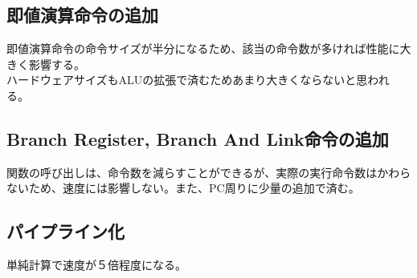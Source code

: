\documentclass{jsreport}
\begin{document}
	\subsection{即値演算命令の追加}
		即値演算命令の命令サイズが半分になるため、該当の命令数が多ければ性能に大きく影響する。\\
        ハードウェアサイズもALUの拡張で済むためあまり大きくならないと思われる。
        
    \subsection{Branch Register, Branch And Link命令の追加}
    	関数の呼び出しは、命令数を減らすことができるが、実際の実行命令数はかわらないため、速度には影響しない。また、PC周りに少量の追加で済む。
        
	\subsection{パイプライン化}
    	単純計算で速度が５倍程度になる。
        
\end{document}
